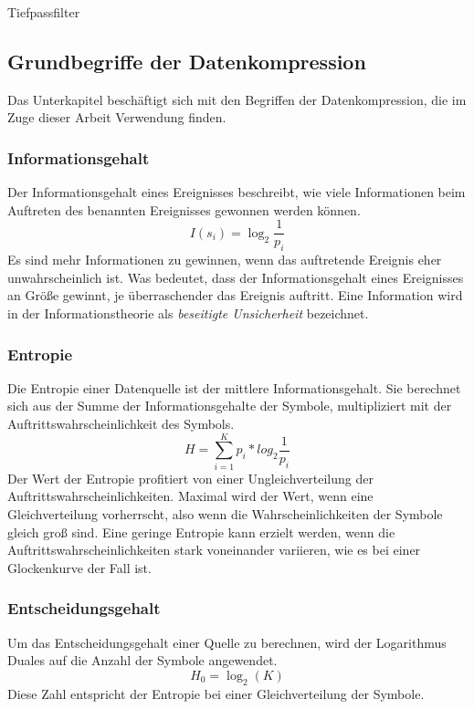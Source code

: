 Tiefpassfilter

\subsection{Grundbegriffe der Datenkompression}
\label{subsec:grundbegriffe_datenkompression}
Das Unterkapitel beschäftigt sich mit den Begriffen der Datenkompression, die im Zuge dieser Arbeit Verwendung finden.

\subsubsection*{Informationsgehalt}
Der Informationsgehalt eines Ereignisses beschreibt, wie viele Informationen beim Auftreten des benannten Ereignisses gewonnen werden können.
\begin{equation*}
I(s_i) = \log_2 \frac{1}{p_i}
\end{equation*}
Es sind mehr Informationen zu gewinnen, wenn das auftretende Ereignis eher unwahrscheinlich ist.
Was bedeutet, dass der Informationsgehalt eines Ereignisses an Größe gewinnt, je überraschender das Ereignis auftritt.
Eine Information wird in der Informationstheorie als \textit{beseitigte Unsicherheit} bezeichnet.

\subsubsection*{Entropie}
Die Entropie einer Datenquelle ist der mittlere Informationsgehalt.
Sie berechnet sich aus der Summe der Informationsgehalte der Symbole, multipliziert mit der Auftrittswahrscheinlichkeit des Symbols.
\begin{equation*}
H = \sum_{i = 1}^{K} p_i * log_2 \frac{1}{p_i}
\end{equation*}
Der Wert der Entropie profitiert von einer Ungleichverteilung der Auftrittswahrscheinlichkeiten.
Maximal wird der Wert, wenn eine Gleichverteilung vorherrscht, also wenn die Wahrscheinlichkeiten der Symbole gleich groß sind.
Eine geringe Entropie kann erzielt werden, wenn die Auftrittswahrscheinlichkeiten stark voneinander variieren, wie es bei einer Glockenkurve der Fall ist. 

\subsubsection*{Entscheidungsgehalt}
Um das Entscheidungsgehalt einer Quelle zu berechnen, wird der Logarithmus Duales auf die Anzahl der Symbole angewendet.
\begin{equation*}
H_0 = \log_2 (K)
\end{equation*}
Diese Zahl entspricht der Entropie bei einer Gleichverteilung der Symbole.

